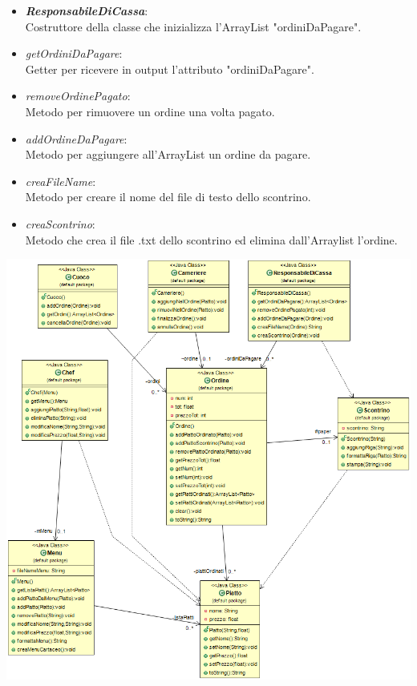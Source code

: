 \documentclass{article}
\begin{document}
\begin{itemize}
\begin{itemize}
            \begin{itemize}
                \item \textbf{\textit{ResponsabileDiCassa}}: \\ Costruttore della classe che inizializza l'ArrayList "ordiniDaPagare".\\ 
                \item \textit{getOrdiniDaPagare}: \\Getter per ricevere in output l'attributo "ordiniDaPagare".\\
                \item \textit{removeOrdinePagato}: \\Metodo per rimuovere un ordine una volta pagato.\\
                \item \textit{addOrdineDaPagare}: \\Metodo per aggiungere all'ArrayList un ordine da pagare.\\
                \item \textit{creaFileName}: \\Metodo per creare il nome del file di testo dello scontrino.\\
                \item \textit{creaScontrino}: \\Metodo che crea il file .txt dello scontrino ed elimina dall'Arraylist l'ordine.\\
             
            \end{itemize}
            
        \end{itemize}
        
        \includegraphics[width=\textwidth]{RestaurantManagerUML.png}
            
    \end{itemize}
    
\end{document}

